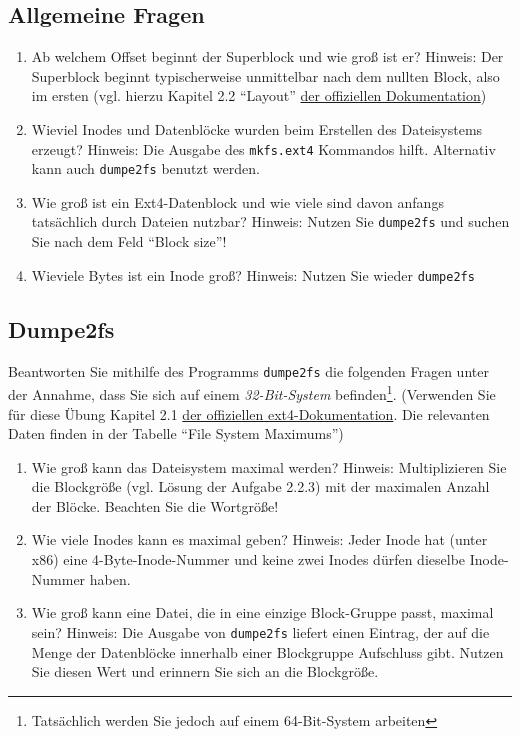 \documentclass[11pt,a4paper]{article}
\def\inlinebash{\lstinline[style=bash]}
\begin{document}
\subsection{Allgemeine Fragen}
\begin{enumerate}
\item Ab welchem Offset beginnt der Superblock und
	wie groß ist er? Hinweis: Der Superblock beginnt typischerweise unmittelbar
	nach dem nullten Block, also im ersten (vgl. hierzu Kapitel 2.2 ``Layout''
	\href{https://ext4.wiki.kernel.org/index.php/Ext4_Disk_Layout#Layout}{der offiziellen Dokumentation})
\item Wieviel Inodes und Datenblöcke wurden beim Erstellen des Dateisystems erzeugt?
	Hinweis: Die Ausgabe des \inlinebash$mkfs.ext4$ Kommandos hilft. Alternativ 
	kann auch \inlinebash$dumpe2fs$ benutzt werden.
\item Wie groß ist ein Ext4-Datenblock und wie viele sind davon anfangs
	tatsächlich durch Dateien nutzbar? Hinweis: Nutzen Sie \inlinebash$dumpe2fs$ und
	suchen Sie nach dem Feld ``Block size''!
\item Wieviele Bytes ist ein Inode groß? Hinweis: Nutzen Sie wieder \inlinebash$dumpe2fs$
\end{enumerate}

\subsection{Dumpe2fs}
	Beantworten Sie mithilfe des Programms \inlinebash$dumpe2fs$ 
	die folgenden Fragen unter der Annahme,
	dass Sie sich auf einem \emph{32-Bit-System}
	befinden\footnote{Tatsächlich werden Sie jedoch auf 
		einem 64-Bit-System arbeiten}. (Verwenden Sie für diese
	Übung Kapitel 2.1
	\href{https://ext4.wiki.kernel.org/index.php/Ext4_Disk_Layout#Blocks}{der offiziellen ext4-Dokumentation}. Die relevanten Daten finden in der Tabelle ``File System Maximums'')
	\begin{enumerate}
		\item Wie groß kann das Dateisystem maximal werden? 
			Hinweis: Multiplizieren Sie die Blockgröße (vgl. Lösung der Aufgabe 2.2.3)
			mit der maximalen Anzahl der Blöcke. Beachten Sie die Wortgröße!
		\item Wie viele Inodes kann es maximal geben? Hinweis: 
			Jeder Inode hat (unter x86) eine 4-Byte-Inode-Nummer und keine zwei Inodes
			dürfen dieselbe Inode-Nummer haben.
		\item Wie groß kann eine Datei, die in eine einzige Block-Gruppe passt,
			maximal sein? Hinweis: Die Ausgabe von \inlinebash$dumpe2fs$ liefert
			einen Eintrag, der auf die Menge der Datenblöcke innerhalb einer
			Blockgruppe Aufschluss gibt. Nutzen Sie diesen Wert und erinnern Sie sich
			an die Blockgröße. 
	\end{enumerate}
\end{document}
